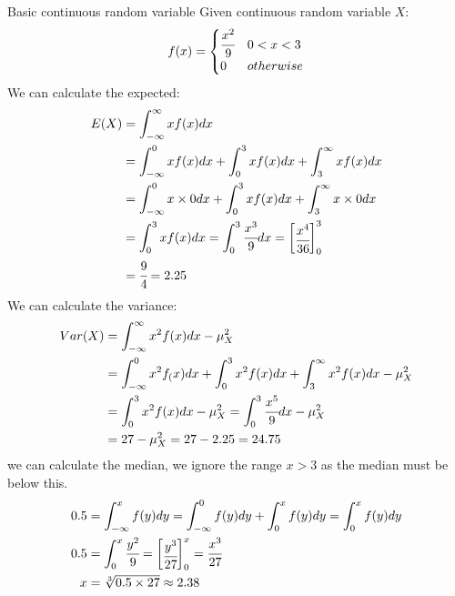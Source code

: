 \begin{examplebox}{Basic continuous random variable}
	Given continuous random variable $X$:
	\[f(x) = \begin{cases}
			\cfrac{x^2}{9} & 0 < x < 3 \\
			0              & otherwise \\
		\end{cases}\]
	We can calculate the expected:
	\[\begin{split}
			E(X) & = \int_{-\infty}^{\infty}xf(x)dx \\
			& = \int_{-\infty}^{0}xf(x)dx + \int_{0}^{3}xf(x)dx + \int_{3}^{\infty}xf(x)dx \\
			& = \int_{-\infty}^{0}x \times 0 dx + \int_{0}^{3}xf(x)dx + \int_{3}^{\infty}x \times 0 dx \\
			& = \int_{0}^{3}xf(x)dx = \int_{0}^{3}\cfrac{x^3}{9}dx = \begin{bmatrix}
				\cfrac{x^4}{36}
			\end{bmatrix}^3_0 \\
			& = \cfrac{9}{4} = 2.25\\
		\end{split}\]
	We can calculate the variance:
	\[\begin{split}
			Var(X) & = \int_{-\infty}^{\infty}x^2f(x)dx - \mu_X^2 \\
			& = \int_{-\infty}^{0}x^2f_(x)dx + \int_{0}^{3}x^2f(x)dx + \int_{3}^{\infty}x^2f(x)dx - \mu_X^2 \\
			& = \int_{0}^{3}x^2f(x)dx - \mu_X^2 = \int_{0}^{3}\cfrac{x^5}{9}dx - \mu_X^2\\
			& = 27 - \mu_X^2 = 27 - 2.25 = 24.75 \\
		\end{split}\]
	we can calculate the median, we ignore the range $x > 3$ as the median must be below this.
	\[\begin{split}
			0.5 &= \int_{-\infty}^{x}f(y)dy = \int_{-\infty}^{0}f(y)dy + \int_{0}^{x}f(y)dy = \int_{0}^{x}f(y)dy\\
			0.5 &= \int_{0}^{x}\cfrac{y^2}{9} = \begin{bmatrix}
				\cfrac{y^3}{27}
			\end{bmatrix}_0^x = \cfrac{x^3}{27}\\
			x &= \sqrt[3]{0.5 \times 27} \approx 2.38 \\
		\end{split}\]
\end{examplebox}
